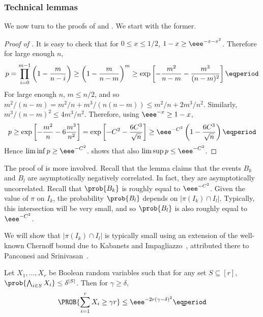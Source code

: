 \documentclass{toc}
\begin{document}
\subsubsection{Technical lemmas}

We now turn to the proofs of  and . We start with the former.

\begin{proof}[Proof of ]
 It is easy to check that for $0 \leq x \leq 1/2$, $1-x \geq \eee^{-x-x^2}$. Therefore for large enough $n$,
\begin{equation}
 p = \prod_{i=0}^{m-1} \left(1 - \frac{m}{n-i}\right) \geq
 \left(1 - \frac{m}{n-m}\right)^m \geq
 \exp \left[ -\frac{m^2}{n-m}-\frac{m^3}{(n-m)^2} \right] \eqperiod
\end{equation}
 For large enough $n$, $m \leq n/2$, and so $m^2/(n-m) = m^2/n + m^3/(n(n-m)) \leq m^2/n + 2m^3/n^2$. Similarly, $m^3/(n-m)^2 \leq 4m^3/n^2$. Therefore, using $\eee^{-x} \geq 1-x$,
\begin{equation}
 p \geq \exp \left[ -\frac{m^2}{n} - 6\frac{m^3}{n^2} \right] = \exp \left[ -C^2 -\frac{6C^3}{\sqrt{n}} \right] \geq \eee^{-C^2} \left(1 - \frac{6C^3}{\sqrt{n}}\right) \eqperiod
\end{equation}
 Hence $\liminf p \geq \eee^{-C^2}$.  shows that also $\limsup p \leq \eee^{-C^2}$.
\end{proof}

The proof of  is more involved. Recall that the lemma claims that the events $B_k$ and $B_l$ are asymptotically negatively correlated. In fact, they are asymptotically uncorrelated. Recall that $\prob{B_k}$ is roughly equal to $\eee^{-C^2}$. Given the value of $\pi$ on $I_k$, the probability $\prob{B_l}$ depends on $|\pi(I_k) \cap I_l|$. Typically, this intersection will be very small, and so $\prob{B_l}$ is also roughly equal to $\eee^{-C^2}$.

%
%
%

We will show that $|\pi(I_k) \cap I_l|$ is typically small using an
  extension of the well-known Chernoff bound due to Kabanets and
  Impagliazzo~\cite[Theorem 1.1]{KI}, attributed there to Panconesi and
  Srinivasan~\cite{PS}.


\begin{theorem} \label{thm:chernoff}
 Let $X_1,\ldots,X_r$ be Boolean random variables such that for any set $S \subseteq [r]$, $\prob{\bigwedge_{i \in S} X_i} \leq \delta^{|S|}$. Then for $\gamma \geq \delta$,
\begin{equation*}
 \PROB{\sum_{i=1}^r X_i \geq \gamma r} \leq \eee^{-2r(\gamma - \delta)^2} \eqperiod
\end{equation*}
\end{theorem}
\end{document}
